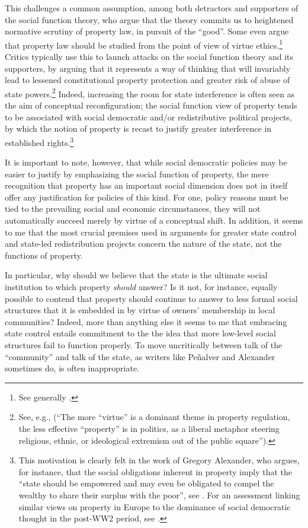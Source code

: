 This challenges a common assumption, among both detractors and supporters of the social function theory, who argue that the theory commits us to heightened normative scrutiny of property law, in pursuit of the ``good''. Some even argue that property law should be studied from the point of view of virtue ethics.\footnote{See generally \cite{penalver09}.} Critics typically use this to launch attacks on the social function theory and its supporters, by arguing that it represents a way of thinking that will invariably lead to lessened constitutional property protection and greater risk of abuse of state powers.\footnote{See, e.g., \cite{claeys09} (``The more ``virtue'' is a dominant theme in property regulation, the less effective ``property'' is in politics, as a liberal metaphor steering religious, ethnic, or ideological extremism out of the public square'').} Indeed, increasing the room for state interference is often seen as the aim of conceptual reconfiguration; the social function view of property tends to be associated with social democratic and/or redistributive political projects, by which the notion of property is recast to justify greater interference in established rights.\footnote{This motivation is clearly felt in the work of Gregory Alexander, who argues, for instance, that the social obligations inherent in property imply that the ``state should be empowered and may even be obligated to compel the wealthy to share their surplus with the poor'', see \cite[746]{alexander09}. For an assessment linking similar views on property in Europe to the dominance of social democratic thought in the post-WW2 period, see \cite{allen10}.}

It is important to note, however, that while social democratic policies may be easier to justify by emphasizing the social function of property, the mere recognition that property has an important social dimension does not in itself offer any justification for policies of this kind. For one, policy reasons must be tied to the prevailing social and economic circumstances, they will not automatically succeed merely by virtue of a conceptual shift. In addition, it seems to me that the most crucial premises used in arguments for greater state control and state-led redistribution projects concern the nature of the state, not the functions of property.

In particular, why should we believe that the state is the ultimate social institution to which property {\it should} answer? Is it not, for instance, equally possible to contend that property should continue to answer to less formal social structures that it is embedded in by virtue of owners' membership in local communities? Indeed, more than anything else it seems to me that embracing state control entails commitment to the the idea that more low-level social structures fail to function properly. To move uncritically between talk of the ``community'' and talk of the state, as writers like Pe\~{n}alver and Alexander sometimes do, is often inappropriate.

